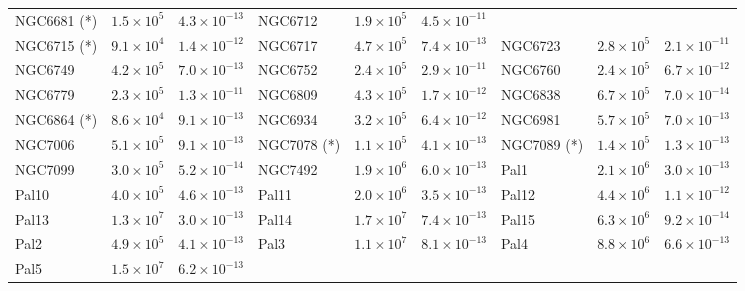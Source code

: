 \begin{table}
\begin{center}
\begin{tabular}{l | c | c | l |  c|   c | l | c | c }
            NGC6681 (*) &  $1.5\times10^5$ &          $4.3\times10^{-13}$  &
            NGC6712 &  $1.9\times10^5$ &          $4.5\times10^{-11}$  \\
            NGC6715 (*) &  $9.1\times10^4$ &          $1.4\times10^{-12}$&
            NGC6717 &  $4.7\times10^5$ &          $7.4\times10^{-13}$  &
            NGC6723 &  $2.8\times10^5$ &          $2.1\times10^{-11}$  \\
            NGC6749 &  $4.2\times10^5$ &         $7.0\times10^{-13}$  &
            NGC6752 &  $2.4\times10^5$ &          $2.9\times10^{-11}$ &
            NGC6760 &  $2.4\times10^5$ &          $6.7\times10^{-12}$ \\ 
            NGC6779 &  $2.3\times10^5$ &          $1.3\times10^{-11}$  &
            NGC6809 &  $4.3\times10^5$ &          $1.7\times10^{-12}$  &
            NGC6838 &  $6.7\times10^5$ &          $7.0\times10^{-14}$  \\
            NGC6864 (*) &  $8.6\times10^4$ &          $9.1\times10^{-13}$  &
            NGC6934 &  $3.2\times10^5$ &          $6.4\times10^{-12}$  &
            NGC6981 &  $5.7\times10^5$ &          $7.0\times10^{-13}$ \\
            NGC7006 &  $5.1\times10^5$ &          $9.1\times10^{-13}$ &
            NGC7078 (*) &  $1.1\times10^5$ &          $4.1\times10^{-13}$  &
            NGC7089 (*) &  $1.4\times10^5$ &          $1.3\times10^{-13}$ \\
            NGC7099 & $ 3.0\times10^5$ &          $5.2\times10^{-14}$  &
            NGC7492 &  $1.9\times10^6$ &          $6.0\times10^{-13}$ &
                Pal1 &  $2.1\times10^6$ &          $3.0\times10^{-13}$ \\
                Pal10 &  $4.0\times10^5 $&          $4.6\times10^{-13}$  &
                Pal11 &  $2.0\times10^6$ &          $3.5\times10^{-13}$  &
                Pal12 &  $4.4\times10^6$ &          $1.1\times10^{-12}$  \\
                Pal13 &  $1.3\times10^7$ &          $3.0\times10^{-13}$  &
                Pal14 &  $1.7\times10^7$ &          $7.4\times10^{-13}$  &
                Pal15 &  $6.3\times10^6$ &          $9.2\times10^{-14}$  \\
                Pal2 &  $4.9\times10^5$ &          $4.1\times10^{-13}$  &
                Pal3 &  $1.1\times10^7$ &          $8.1\times10^{-13}$  &
                Pal4 &  $8.8\times10^6$ &          $6.6\times10^{-13}$  \\
                Pal5 &  $1.5\times10^7$ &          $6.2\times10^{-13}$  &

\end{tabular}
\end{center}
\end{table}
